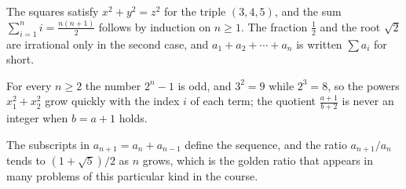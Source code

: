 \documentclass[11pt]{article}
\begin{document}
The squares satisfy $x^2+y^2=z^2$ for the triple $(3,4,5)$, and the sum
$\sum_{i=1}^n i=\frac{n(n+1)}{2}$ follows by induction on $n\ge 1$. The
fraction $\frac12$ and the root $\sqrt{2}$ are irrational only in the second
case, and $a_1+a_2+\cdots+a_n$ is written $\sum a_i$ for short.

For every $n\ge 2$ the number $2^n-1$ is odd, and $3^2=9$ while $2^3=8$, so
the powers $x_1^2+x_2^2$ grow quickly with the index $i$ of each term; the
quotient $\frac{a+1}{b+2}$ is never an integer when $b=a+1$ holds.

The subscripts in $a_{n+1}=a_n+a_{n-1}$ define the sequence, and the ratio
$a_{n+1}/a_n$ tends to $(1+\sqrt5)/2$ as $n$ grows, which is the golden ratio
that appears in many problems of this particular kind in the course.
\end{document}
